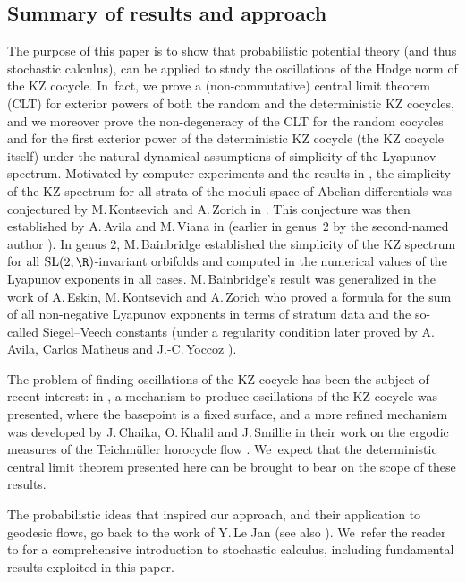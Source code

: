\documentclass[JEP,XML,SOM,Unicode,published]{cedram}
\theoremstyle{plain}
\theoremstyle{definition}
\numberwithin{equation}{subsection}
\newcommand{\SL}{\mathrm{SL}}
\newcommand{\Tm}{Teichmüller\xspace}
\begin{document}
\subsection{Summary of results and approach}

The purpose of this paper is to show that probabilistic potential theory (and thus stochastic calculus), can be applied to study the oscillations of the Hodge norm of the KZ cocycle. In~fact, we prove a (non-commutative) central limit theorem (CLT) for exterior powers of both the random and the deterministic KZ cocycles, and we moreover prove the non-degeneracy of the CLT for the random cocycles and for the first exterior power of the deterministic KZ cocycle (the KZ cocycle itself) under the natural dynamical assumptions of simplicity of the Lyapunov spectrum. Motivated by computer experiments and the results in \cite{Z96, Z97}, the simplicity of the KZ spectrum for all strata of the moduli space of Abelian differentials was conjectured by M.\,Kontsevich and A.\,Zorich in \cite{KZ97, Kon97}. This conjecture was then established by A.\,Avila and M.\,Viana in \cite{AV07} (earlier in genus~$2$ by the second-named author \cite{For02}). In genus $2$, M.\,Bainbridge established the simplicity of the KZ spectrum for all $\SL(2,\R)$-invariant orbifolds and computed in \cite{B07} the numerical values of the Lyapunov exponents in all cases. M.\,Bainbridge's result was generalized in the work of A.\,Eskin, M.\,Kontsevich and A.\,Zorich \cite{EKZ14} who proved a formula for the sum of all non-negative Lyapunov exponents in terms of stratum data and the so-called Siegel--Veech constants (under a regularity condition later proved by A.\,Avila,
Carlos Matheus and J.\nobreakdash-C.\,Yoccoz \cite{AMY13}).

The problem of finding oscillations of the KZ cocycle has been the subject of recent interest: in \cite{A21}, a mechanism to produce oscillations of the KZ cocycle was presented, where the basepoint is a fixed surface, and a more refined mechanism was developed by J.\,Chaika, O.\,Khalil and J.\,Smillie in their work on the ergodic measures of the \Tm horocycle flow \cite{CKS21}. We~expect that the deterministic central limit theorem presented here can be brought to bear on the scope of these results.

The probabilistic ideas that inspired our approach, and their application to geodesic flows, go back to the work of Y.\,Le Jan \cite{L94} (see also \cite{FL12}). We~refer the reader to \cite{RY} for a comprehensive introduction to stochastic calculus, including fundamental results exploited in this paper.
\end{document}
